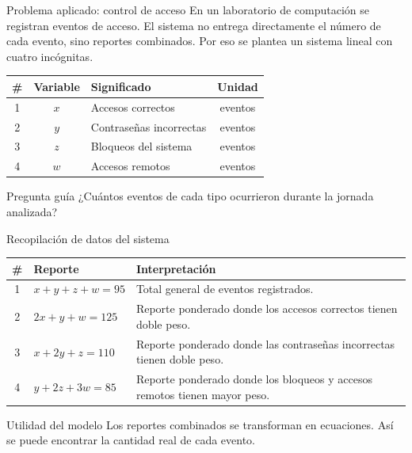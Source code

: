 \documentclass[aspectratio=169]{beamer}
\begin{document}
\begin{frame}{Problema aplicado: control de acceso}
\justifying
En un laboratorio de computación se registran eventos de acceso. El sistema no entrega directamente el número de cada evento, sino reportes combinados. Por eso se plantea un sistema lineal con cuatro incógnitas.

\vspace{0.25cm}
\begin{table}
\centering
\begin{tabular}{cclc}
\toprule
\# & Variable & Significado & Unidad \\
\midrule
1 & $x$ & Accesos correctos & eventos \\
2 & $y$ & Contraseñas incorrectas & eventos \\
3 & $z$ & Bloqueos del sistema & eventos \\
4 & $w$ & Accesos remotos & eventos \\
\bottomrule
\end{tabular}
\end{table}

\begin{alertblock}{Pregunta guía}
¿Cuántos eventos de cada tipo ocurrieron durante la jornada analizada?
\end{alertblock}
\end{frame}

\begin{frame}{Recopilación de datos del sistema}
\begin{table}
\centering
\scriptsize
\begin{tabular}{clp{8.7cm}}
\toprule
\# & Reporte & Interpretación \\
\midrule
1 & $x+y+z+w=95$ & Total general de eventos registrados. \\
2 & $2x+y+w=125$ & Reporte ponderado donde los accesos correctos tienen doble peso. \\
3 & $x+2y+z=110$ & Reporte ponderado donde las contraseñas incorrectas tienen doble peso. \\
4 & $y+2z+3w=85$ & Reporte ponderado donde los bloqueos y accesos remotos tienen mayor peso. \\
\bottomrule
\end{tabular}
\end{table}

\begin{block}{Utilidad del modelo}
Los reportes combinados se transforman en ecuaciones. Así se puede encontrar la cantidad real de cada evento.
\end{block}
\end{frame}
\end{document}
